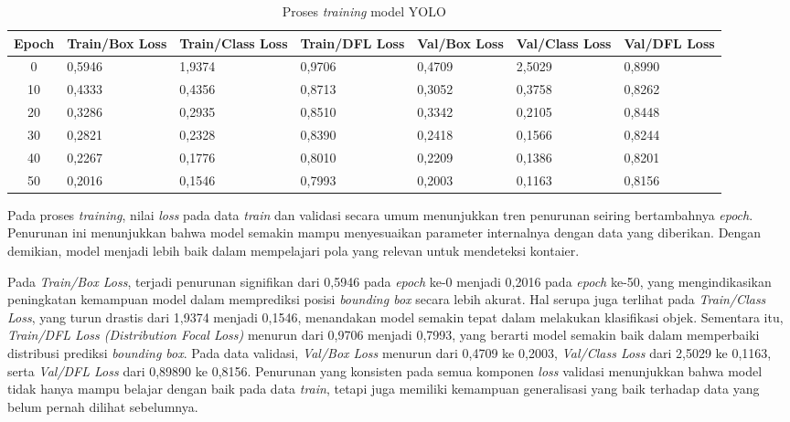 \begin{table}[H]
  \caption{Proses \textit{training} model YOLO}
  \label{tab:yolo-train}
  \vspace{-1em}
  \centering
  \small
  \begin{tabular}{c p{1.5cm} p{1.5cm} p{1.5cm} p{1.5cm} p{1.5cm} p{1.5cm}}
    \toprule
    \textbf{Epoch} & \textbf{Train/Box Loss} & \textbf{Train/Class Loss}
    & \textbf{Train/DFL Loss} & \textbf{Val/Box Loss}
    & \textbf{Val/Class Loss} & \textbf{Val/DFL Loss} \\
    \midrule
    0  & 0,5946 & 1,9374 & 0,9706 & 0,4709 & 2,5029 & 0,8990 \\
    10 & 0,4333 & 0,4356 & 0,8713 & 0,3052 & 0,3758 & 0,8262 \\
    20 & 0,3286 & 0,2935 & 0,8510 & 0,3342 & 0,2105 & 0,8448 \\
    30 & 0,2821 & 0,2328 & 0,8390 & 0,2418 & 0,1566 & 0,8244 \\
    40 & 0,2267 & 0,1776 & 0,8010 & 0,2209 & 0,1386 & 0,8201 \\
    50 & 0,2016 & 0,1546 & 0,7993 & 0,2003 & 0,1163 & 0,8156 \\
    \bottomrule
  \end{tabular}
  \normalsize
\end{table}
Pada proses \textit{training}, nilai \textit{loss} pada data
\textit{train} dan validasi secara umum menunjukkan tren penurunan
seiring bertambahnya \textit{epoch}. Penurunan ini menunjukkan bahwa
model semakin mampu menyesuaikan parameter internalnya dengan data
yang diberikan. Dengan demikian, model menjadi lebih baik dalam
mempelajari pola yang relevan untuk mendeteksi kontaier.

Pada \textit{Train/Box Loss}, terjadi penurunan signifikan dari
0,5946 pada \textit{epoch} ke-0 menjadi 0,2016 pada \textit{epoch}
ke-50, yang mengindikasikan peningkatan kemampuan model dalam
memprediksi posisi \textit{bounding box} secara lebih akurat. Hal
serupa juga terlihat pada \textit{Train/Class Loss}, yang turun
drastis dari 1,9374 menjadi 0,1546, menandakan model semakin tepat
dalam melakukan klasifikasi objek. Sementara itu, \textit{Train/DFL
Loss (Distribution Focal Loss)} menurun dari 0,9706 menjadi 0,7993,
yang berarti model semakin baik dalam memperbaiki distribusi prediksi
\textit{bounding box}. Pada data validasi, \textit{Val/Box Loss}
menurun dari 0,4709 ke 0,2003, \textit{Val/Class Loss} dari 2,5029
ke 0,1163, serta \textit{Val/DFL Loss} dari 0,89890 ke 0,8156.
Penurunan yang konsisten pada semua komponen \textit{loss} validasi
menunjukkan bahwa model tidak hanya mampu belajar dengan baik pada
data \textit{train}, tetapi juga memiliki kemampuan generalisasi yang
baik terhadap data yang belum pernah dilihat sebelumnya.

